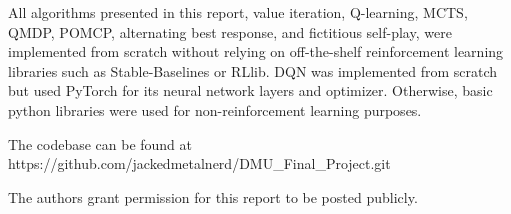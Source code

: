 \documentclass[conference]{IEEEtran}
\begin{document}
All algorithms presented in this report, value iteration, Q-learning, MCTS,
QMDP, POMCP, alternating best response, and fictitious self-play, were
implemented from scratch without relying on off-the-shelf reinforcement
learning libraries such as Stable-Baselines or RLlib. DQN was
implemented from scratch but used PyTorch for its neural network layers
and optimizer. Otherwise, basic python libraries were used for non-reinforcement learning purposes.

The codebase can be found at https://github.com/jackedmetalnerd/DMU_Final_Project.git

The authors grant permission for this report to be posted publicly.



\end{document}
